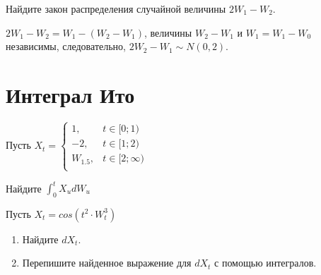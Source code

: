 \begin{problem}
Найдите закон распределения случайной величины $2W_1-W_2$.

\begin{sol}
$2W_1-W_2=W_1-(W_2-W_1)$, величины $W_2-W_1$ и $W_1=W_1-W_0$ независимы, следовательно, $2W_2-W_1\sim N(0,2)$.
\end{sol}
\end{problem}


\section{Интеграл Ито}

\begin{problem}
Пусть $X_{t}=
\begin{cases}
1, & t\in[0;1) \\
-2, & t\in[1;2) \\
W_{1.5},& t\in[2;\infty) \\
\end{cases}$

Найдите $\int_{0}^{t}X_{u}dW_{u}$

\begin{sol}

\end{sol}
\end{problem}

\begin{problem}
Пусть $X_{t}=cos(t^{2}\cdot W_{t}^{3})$
\begin{enumerate}
\item  Найдите $dX_{t}$.
\item Перепишите найденное выражение для $dX_{t}$ с помощью интегралов.
\end{enumerate}

\begin{sol}

\end{sol}
\end{problem}

